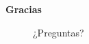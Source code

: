 \documentclass[compress]{beamer}
\begin{document}
\begin{frame}
	\centering \textbf{Gracias}

	\begin{figure}[H,font=\Small]
		\centering
		\label{fig:calidad}
		
		¿Preguntas?
		
	\end{figure}
	
	
\end{frame}
\end{document}
